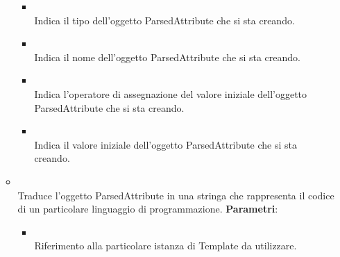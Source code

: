 \begin{itemize}
\begin{itemize}
\begin{itemize}
\item {}
\\ Indica il tipo dell'oggetto ParsedAttribute che si sta creando.
\item {}
\\  Indica il nome dell'oggetto ParsedAttribute che si sta creando.
\item {}
\\ Indica l'operatore di assegnazione del valore iniziale dell'oggetto ParsedAttribute che si sta creando.
\item {}
\\ Indica il valore iniziale dell'oggetto ParsedAttribute che si sta creando.
\end{itemize}
\item {}
\\ Traduce l'oggetto ParsedAttribute in una stringa che rappresenta il codice di un particolare linguaggio di programmazione.
\textbf{Parametri}:
\begin{itemize}
\item {}
\\ Riferimento alla particolare istanza di Template da utilizzare.
\end{itemize}
\end{itemize}
\end{itemize}

